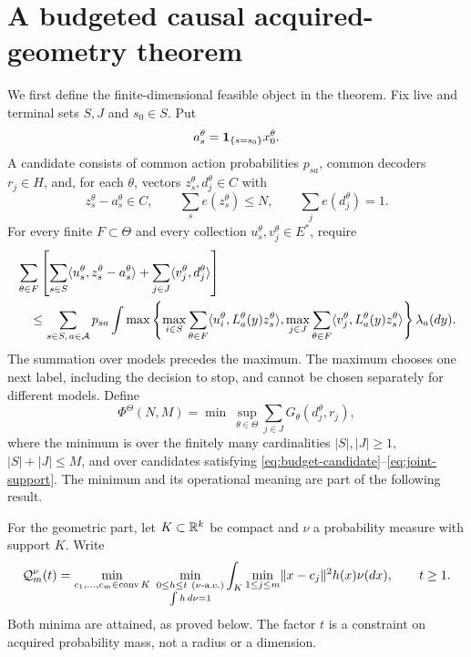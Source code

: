\section{A budgeted causal acquired-geometry theorem}\label{sec:central}
We first define the finite-dimensional feasible object in the theorem. Fix live and terminal sets $S,J$ and $s_0\in S$. Put
\[
 a_s^\theta=\mathbf 1_{\{s=s_0\}}x_0^\theta.
\]
A candidate consists of common action probabilities $p_{sa}$, common decoders $r_j\in H$, and, for each $\theta$, vectors $z_s^\theta,d_j^\theta\in C$ with
\begin{equation}\label{eq:budget-candidate}
 z_s^\theta-a_s^\theta\in C,\qquad
 \sum_s e(z_s^\theta)\le N,\qquad
 \sum_j e(d_j^\theta)=1.
\end{equation}
For every finite $F\subset\Theta$ and every collection $u_s^\theta,v_j^\theta\in E^*$, require
\begin{align}
 &\sum_{\theta\in F}\left[
   \sum_{s\in S}\langle u_s^\theta,z_s^\theta-a_s^\theta\rangle
       +\sum_{j\in J}\langle v_j^\theta,d_j^\theta\rangle\right]\notag\\
 &\quad\le\sum_{s\in S,\,a\in\mathcal A}p_{sa}
    \int \max\left\{
      \max_{i\in S}\sum_{\theta\in F}\langle u_i^\theta,L_a^\theta(y)z_s^\theta\rangle,
      \max_{j\in J}\sum_{\theta\in F}\langle v_j^\theta,L_a^\theta(y)z_s^\theta\rangle
              \right\}\lambda_a(dy).\label{eq:joint-support}
\end{align}
The summation over models precedes the maximum. The maximum chooses one next label, including the decision to stop, and cannot be chosen separately for different models. Define
\begin{equation}\label{eq:Phi}
 \Phi^\Theta(N,M)=
 \min\ \sup_{\theta\in\Theta}\sum_{j\in J}G_\theta(d_j^\theta,r_j),
\end{equation}
where the minimum is over the finitely many cardinalities $|S|,|J|\ge1$, $|S|+|J|\le M$, and over candidates satisfying \eqref{eq:budget-candidate}--\eqref{eq:joint-support}. The minimum and its operational meaning are part of the following result.

For the geometric part, let $K\subset\mathbb R^k$ be compact and $\nu$ a probability measure with support $K$. Write
\begin{equation}\label{eq:profile}
 \mathcal Q_m^\nu(t)=\min_{c_1,\ldots,c_m\in\operatorname{conv} K}
 \ \min_{\substack{0\le h\le t\ (\nu\text{-a.e.})\\\int h\,d\nu=1}}
       \int_K\min_{1\le j\le m}\lVert x-c_j\rVert^2h(x)\nu(dx),
 \qquad t\ge1.
\end{equation}
Both minima are attained, as proved below. The factor $t$ is a constraint on acquired probability mass, not a radius or a dimension.

